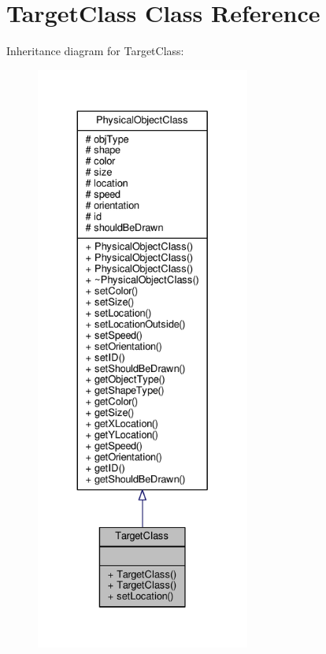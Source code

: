 \hypertarget{classTargetClass}{\section{Target\-Class Class Reference}
\label{classTargetClass}
}


Inheritance diagram for Target\-Class\-:
\nopagebreak
\begin{figure}[H]
\begin{center}
\leavevmode
\includegraphics[height=550pt]{classTargetClass__inherit__graph}
\end{center}
\end{figure}


